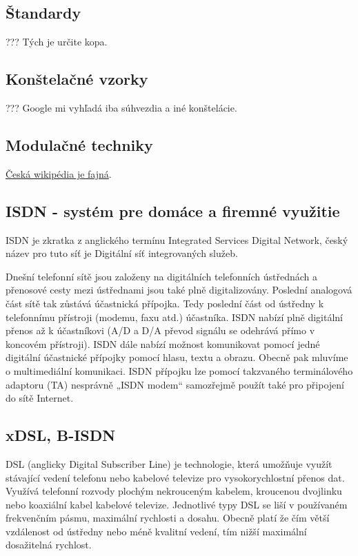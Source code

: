 \documentclass[10pt,a4paper]{article}
\begin{document}
\subsection{Štandardy}    
??? Tých je určite kopa. 

\subsection{Konštelačné vzorky}  
??? Google mi vyhľadá iba súhvezdia a iné konštelácie. 

\subsection{Modulačné techniky}   
\href{http://cs.wikipedia.org/wiki/Modulace}{Česká wikipédia je fajná}. 

\subsection{ISDN - systém pre domáce a firemné využitie}  
ISDN je zkratka z anglického termínu Integrated Services Digital Network, český název pro tuto síť je Digitální síť integrovaných služeb.

Dnešní telefonní sítě jsou založeny na digitálních telefonních ústřednách a přenosové cesty mezi ústřednami jsou také plně digitalizovány. Poslední analogová část sítě tak zůstává účastnická přípojka. Tedy poslední část od ústředny k telefonnímu přístroji (modemu, faxu atd.) účastníka. ISDN nabízí plně digitální přenos až k účastníkovi (A/D a D/A převod signálu se odehrává přímo v koncovém přístroji). ISDN dále nabízí možnost komunikovat pomocí jedné digitální účastnické přípojky pomocí hlasu, textu a obrazu. Obecně pak mluvíme o multimediální komunikaci. ISDN přípojku lze pomocí takzvaného terminálového adaptoru (TA) nesprávně „ISDN modem“ samozřejmě použít také pro připojení do sítě Internet.

\subsection{xDSL, B-ISDN}     
  
DSL (anglicky Digital Subscriber Line) je technologie, která umožňuje využít stávající vedení telefonu nebo kabelové televize pro vysokorychlostní přenos dat. Využívá telefonní rozvody plochým nekrouceným kabelem, kroucenou dvojlinku nebo koaxiální kabel kabelové televize. Jednotlivé typy DSL se liší v používaném frekvenčním pásmu, maximální rychlosti a dosahu. Obecně platí že čím větší vzdálenost od ústředny nebo méně kvalitní vedení, tím nižší maximální dosažitelná rychlost.
\end{document}
